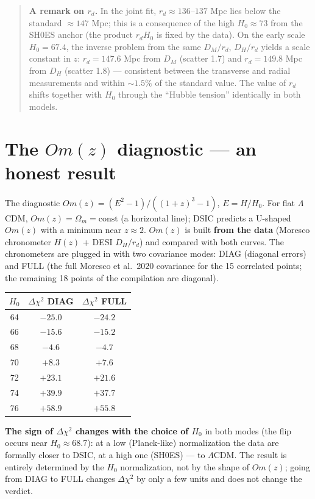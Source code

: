 \documentclass[a4paper,10pt]{article}
\begin{document}
\begin{quote}
\textbf{A remark on $r_d$.} In the joint fit, $r_d \approx 136\text{--}137$ Mpc lies below the standard ${\approx}147$ Mpc; this is a consequence of the high $H_0 \approx 73$ from the SH0ES anchor (the product $r_d H_0$ is fixed by the data). On the early scale $H_0 = 67.4$, the inverse problem from the same $D_M/r_d$, $D_H/r_d$ yields a scale constant in $z$: $r_d = 147.6$ Mpc from $D_M$ (scatter 1.7) and $r_d = 149.8$ Mpc from $D_H$ (scatter 1.8) --- consistent between the transverse and radial measurements and within ${\sim}1.5\%$ of the standard value. The value of $r_d$ shifts together with $H_0$ through the ``Hubble tension'' identically in both models.
\end{quote}

\section{The $Om(z)$ diagnostic --- an honest result}

The diagnostic $Om(z) = (E^2 - 1)/((1+z)^3 - 1)$, $E = H/H_0$. For flat $\Lambda$CDM, $Om(z) = \Omega_m = \text{const}$ (a horizontal line); DSIC predicts a U-shaped $Om(z)$ with a minimum near $z \approx 2$. $Om(z)$ is built \textbf{from the data} (Moresco chronometer $H(z)$ + DESI $D_H/r_d$) and compared with both curves. The chronometers are plugged in with two covariance modes: DIAG (diagonal errors) and FULL (the full Moresco et al.\ 2020 covariance for the 15 correlated points; the remaining 18 points of the compilation are diagonal).

\begin{table}[htbp]
\centering
\small
\begin{tabular}{@{}ccc@{}}
\toprule
$H_0$ & $\Delta\chi^2$ DIAG & $\Delta\chi^2$ FULL \\
\midrule
64 & $-25.0$ & $-24.2$ \\
66 & $-15.6$ & $-15.2$ \\
68 & $-4.6$ & $-4.7$ \\
70 & $+8.3$ & $+7.6$ \\
72 & $+23.1$ & $+21.6$ \\
74 & $+39.9$ & $+37.7$ \\
76 & $+58.9$ & $+55.8$ \\
\bottomrule
\end{tabular}
\end{table}

\textbf{The sign of $\Delta\chi^2$ changes with the choice of $H_0$} in both modes (the flip occurs near $H_0 \approx 68.7$): at a low (Planck-like) normalization the data are formally closer to DSIC, at a high one (SH0ES) --- to $\Lambda$CDM. The result is entirely determined by the $H_0$ normalization, not by the shape of $Om(z)$; going from DIAG to FULL changes $\Delta\chi^2$ by only a few units and does not change the verdict.
\end{document}
